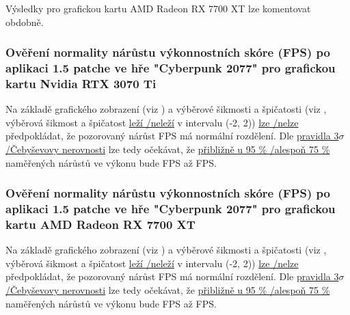 \vspace{1em}
\noindent
Výsledky pro grafickou kartu AMD Radeon RX 7700 XT lze komentovat obdobně.

\subsubsection*{Ověření normality nárůstu výkonnostních skóre (FPS) po aplikaci 1.5 patche ve hře "Cyberpunk 2077" pro grafickou kartu Nvidia RTX 3070 Ti}

Na základě grafického zobrazení (viz ) a výběrové šikmosti a špičatosti (viz , výběrová šikmost a špičatost \ul{leží \slash neleží}
v intervalu (-2, 2)) \ul{lze \slash nelze} předpokládat, že pozorovaný nárůst FPS má normální rozdělení. Dle \ul{pravidla 3$\sigma$ \slash Čebyševovy nerovnosti}
lze tedy očekávat, že \ul{přibližně u 95 \% \slash alespoň 75 \%} naměřených nárůstů ve výkonu bude  FPS až  FPS\@.

\subsubsection*{Ověření normality nárůstu výkonnostních skóre (FPS) po aplikaci 1.5 patche ve hře "Cyberpunk 2077" pro grafickou kartu AMD Radeon RX 7700 XT}

Na základě grafického zobrazení (viz ) a výběrové šikmosti a špičatosti (viz , výběrová šikmost a špičatost \ul{leží \slash neleží}
v intervalu (-2, 2)) \ul{lze \slash nelze} předpokládat, že pozorovaný nárůst FPS má normální rozdělení. Dle \ul{pravidla 3$\sigma$ \slash Čebyševovy nerovnosti}
lze tedy očekávat, že \ul{přibližně u 95 \% \slash alespoň 75 \%} naměřených nárůstů ve výkonu bude  FPS až  FPS\@.

\endinput